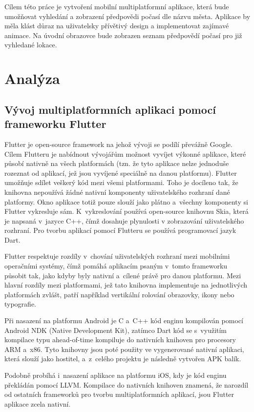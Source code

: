\documentclass[12pt, a4paper]{article}
\let\oldsection\section
\renewcommand\section{\clearpage\oldsection}
\begin{document}
Cílem této práce je vytvoření mobilní multiplatformní aplikace, která bude umožňovat vyhledání a zobrazení předpovědi počasí dle názvu města. Aplikace by měla klást důraz na uživatelsky přívětivý design a implementovat zajímavé animace. Na úvodní obrazovce bude zobrazen seznam předpovědí počasí pro již vyhledané lokace.

   \section{Analýza}

	\subsection{Vývoj multiplatformních aplikaci pomocí frameworku Flutter}
Flutter je open-source framework na jehož vývoji se podílí převážně Google. Cílem Flutteru je nabídnout vývojářům možnost vyvíjet výkonné aplikace, které působí nativně na všech platformách (tzn. že tyto aplikace nelze jednoduše rozeznat od aplikací, jež jsou vyvíjené speciálně na danou platformu). Flutter umožňuje sdílet veškerý kód mezi všemi platformami. Toho je docíleno tak, že knihovna nepoužívá žádné nativní komponenty uživatelského rozhraní dané platformy. Okno aplikace totiž pouze slouží jako plátno a~všechny komponenty si Flutter vykresluje sám. K~vykreslování používá open-source knihovnu Skia, která je napsaná v~jazyce C++, čímž dosahuje plynulosti v zobrazování uživatelského rozhraní. Pro tvorbu aplikací pomocí Flutteru se používá programovací jazyk Dart.

Flutter respektuje rozdíly v~chování uživatelských rozhraní mezi mobilními operačními systémy, čímž pomáhá aplikacím psaným v~tomto frameworku působit tak, jako kdyby byly nativní a~cílené právě pro danou platformu. Mezi hlavní rozdíly mezi platformami, jež tato knihovna implementuje na jednotlivých platformách zvlášt, patří například vertikální rolování obrazovky, ikony nebo typografie.

Při nasazení na platformu Android je C a~C++ kód enginu kompilován pomocí Android NDK (Native Development Kit), zatímco Dart kód se s~využitím kompilace typu ahead-of-time kompiluje do nativních knihoven pro procesory ARM a~x86. Tyto knihovny jsou poté použity ve vygenerované nativní aplikaci, která slouží jako hostitel, a~z~celého projektu je následně vytvořen APK balík. 

Podobně probíhá i~nasazení aplikace na platformu iOS, kdy je kód enginu překládán pomocí LLVM. Kompilace do nativních knihoven znamená, že narozdíl od ostatních frameworků pro tvorbu multiplatformních aplikací, jsou Flutter aplikace zcela nativní. 
\end{document}
